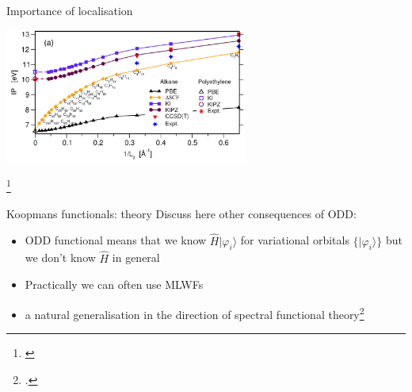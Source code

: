 \documentclass[xcolor=table,aspectratio=169]{beamer}
\newcommand\blfootcite[1]{%
  \begingroup
  \renewcommand\thefootnote{}\footnote{\hspace{-4ex}\cite{#1}}%
  \addtocounter{footnote}{-1}%
  \endgroup
}
\newcommand{\ket}[1]{|#1\rangle}
\numberwithin{equation}{section}
\begin{document}
\begin{frame}{Importance of localisation}
   \begin{center}
      \includegraphics[width=0.6\textwidth]{figures/nguyen_bulk_limit.png}
   \end{center}
   \blfootcite{Nguyen2018}

   \vspace{-2ex}



\end{frame}

\begin{frame}{Koopmans functionals: theory}
   Discuss here other consequences of ODD:
   \begin{itemize}[<+->]
      \item ODD functional means that we know $\hat H \ket{\varphi_i}$ for variational orbitals $\{\ket{\varphi_i}\}$ but we don't know $\hat H$ in general
      \item Practically we can often use MLWFs
      \item a natural generalisation in the direction of spectral functional theory\footcite{Ferretti2014}
   \end{itemize}

\end{frame}
\end{document}
